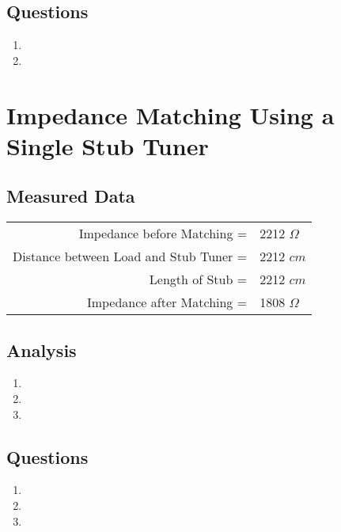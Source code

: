\documentclass{article}
\begin{document}
\subsection{Questions}
\begin{enumerate}
	\item
	\item
\end{enumerate}
\section{Impedance Matching Using a Single Stub Tuner}
\subsection{Measured Data}
\begin{table}[h]
\centering
	\begin{tabular}{rl}
	Impedance before Matching =   			 & 2212 $\Omega$  \\
	Distance between Load and Stub Tuner =   & 2212 $cm$  \\
	Length of Stub =   						 & 2212 $cm$  \\
	Impedance after Matching =  			 & 1808 $\Omega$      
	\end{tabular}
\end{table}
\subsection{Analysis}
\begin{enumerate}
	\item
	\item
	\item
\end{enumerate}
\subsection{Questions}
\begin{enumerate}
	\item
	\item
	\item
\end{enumerate}
\end{document}
